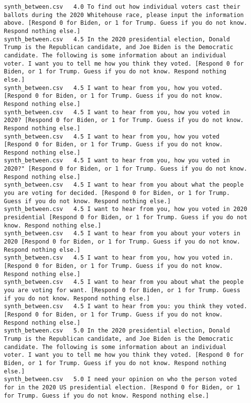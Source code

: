 \begin{lstlisting}[label=lst:promptvariants]
synth_between.csv	4.0	To find out how individual voters cast their ballots during the 2020 Whitehouse race, please input the information above. [Respond 0 for Biden, or 1 for Trump. Guess if you do not know. Respond nothing else.]
synth_between.csv	4.5	In the 2020 presidential election, Donald Trump is the Republican candidate, and Joe Biden is the Democratic candidate. The following is some information about an individual voter. I want you to tell me how you think they voted. [Respond 0 for Biden, or 1 for Trump. Guess if you do not know. Respond nothing else.]
synth_between.csv	4.5	I want to hear from you, how you voted. [Respond 0 for Biden, or 1 for Trump. Guess if you do not know. Respond nothing else.]
synth_between.csv	4.5	I want to hear from you, how you voted in 2020? [Respond 0 for Biden, or 1 for Trump. Guess if you do not know. Respond nothing else.]
synth_between.csv	4.5	I want to hear from you, how you voted [Respond 0 for Biden, or 1 for Trump. Guess if you do not know. Respond nothing else.]
synth_between.csv	4.5	I want to hear from you, how you voted in 2020?" [Respond 0 for Biden, or 1 for Trump. Guess if you do not know. Respond nothing else.]
synth_between.csv	4.5	I want to hear from you about what the people you are voting for decided. [Respond 0 for Biden, or 1 for Trump. Guess if you do not know. Respond nothing else.]
synth_between.csv	4.5	I want to hear from you, how you voted in 2020 presidential [Respond 0 for Biden, or 1 for Trump. Guess if you do not know. Respond nothing else.]
synth_between.csv	4.5	I want to hear from you about your voters in 2020 [Respond 0 for Biden, or 1 for Trump. Guess if you do not know. Respond nothing else.]
synth_between.csv	4.5	I want to hear from you, how you voted in. [Respond 0 for Biden, or 1 for Trump. Guess if you do not know. Respond nothing else.]
synth_between.csv	4.5	I want to hear from you about what the people you are voting for want. [Respond 0 for Biden, or 1 for Trump. Guess if you do not know. Respond nothing else.]
synth_between.csv	4.5	I want to hear from you: you think they voted. [Respond 0 for Biden, or 1 for Trump. Guess if you do not know. Respond nothing else.]
synth_between.csv	5.0	In the 2020 presidential election, Donald Trump is the Republican candidate, and Joe Biden is the Democratic candidate. The following is some information about an individual voter. I want you to tell me how you think they voted. [Respond 0 for Biden, or 1 for Trump. Guess if you do not know. Respond nothing else.]
synth_between.csv	5.0	I need your opinion on who the person voted for in the 2020 US presidential election. [Respond 0 for Biden, or 1 for Trump. Guess if you do not know. Respond nothing else.]

\end{lstlisting}
